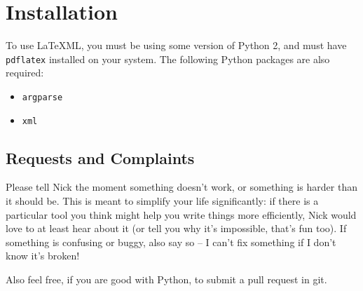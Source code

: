 \section{Installation}
  To use \LaTeX ML, you must be using some version of Python 2, and must have \texttt{pdflatex} installed on your system. The following Python packages are also required:
  
  \begin{itemize}
    \item \texttt{argparse}
    \item \texttt{xml}
  \end{itemize}
  
  \subsection{Requests and Complaints}
    Please tell Nick the moment something doesn't work, or something is harder than it should be. This is meant to simplify your life significantly: if there is a particular tool you think might help you write things more efficiently, Nick would love to at least hear about it (or tell you why it's impossible, that's fun too). If something is confusing or buggy, also say so -- I can't fix something if I don't know it's broken!
    
    Also feel free, if you are good with Python, to submit a pull request in git.